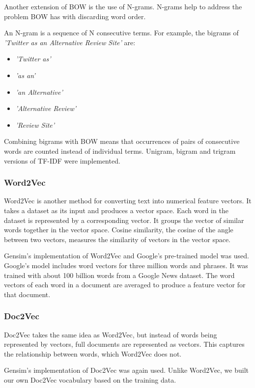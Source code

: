 Another extension of BOW is the use of N-grams. N-grams help to address the problem BOW has with discarding word order.

An N-gram is a sequence of N consecutive terms. For example, the bigrams of \emph{'Twitter as an Alternative Review Site'} are:
\begin{itemize}
    \item \emph{'Twitter as'}
    \item \emph{'as an'}
    \item \emph{'an Alternative'}
    \item \emph{'Alternative Review'}
    \item \emph{'Review Site'}
\end{itemize}

Combining bigrams with BOW means that occurrences of pairs of consecutive words are counted instead of individual terms. Unigram, bigram and trigram versions of TF-IDF were implemented.

\subsubsection{Word2Vec}

Word2Vec is another method for converting text into numerical feature vectors. It takes a dataset as its input and produces a vector space. Each word in the dataset is represented by a corresponding vector. It groups the vector of similar words together in the vector space. Cosine similarity, the cosine of the angle between two vectors, measures the similarity of vectors in the vector space. 

Gensim's implementation of Word2Vec \cite{gensim} and Google's pre-trained model was used. Google's model includes word vectors for three million words and phrases. It was trained with about 100 billion words from a Google News dataset. The word vectors of each word in a document are averaged to produce a feature vector for that document.

\subsubsection*{Doc2Vec}

Doc2Vec takes the same idea as Word2Vec, but instead of words being represented by vectors, full documents are represented as vectors. This captures the relationship between words, which Word2Vec does not.

Gensim's implementation of Doc2Vec was again used. Unlike Word2Vec, we built our own Doc2Vec vocabulary based on the training data.

